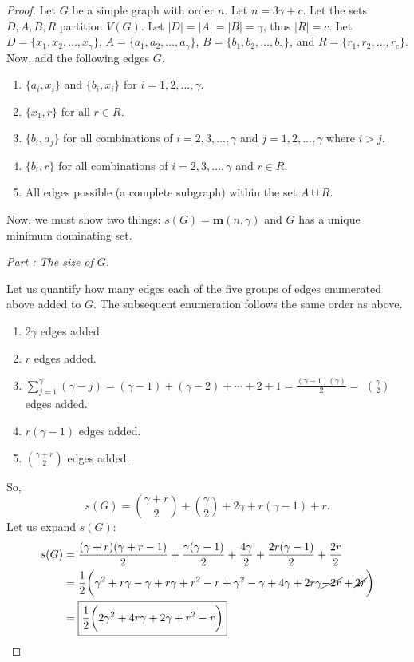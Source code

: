 \documentclass[12pt]{amsart}
\makeatletter
\newcounter{proofpart}
\newcommand{\proofpart}[1]{%
  \par
  \addvspace{\medskipamount}%
  \stepcounter{proofpart}%
  \noindent\emph{Part \theproofpart: #1}\par\nobreak\smallskip
  \@afterheading
}
\makeatother
\begin{document}
\begin{proof}
    Let $G$ be a simple graph with order $n$. Let $n = 3\gamma + c$. Let the sets $D,A,B,R$ partition $V(G)$. Let $|D| = |A| = |B| = \gamma$, thus $|R| = c$. Let $D = \{x_1,x_2,\ldots,x_\gamma\}$, $A = \{a_1,a_2,\ldots,a_\gamma\}$, $B = \{b_1,b_2,\ldots,b_\gamma\}$, and $R = \{r_1,r_2,\ldots,r_c\}$. Now, add the following edges $G$.
\begin{enumerate}
 \item $\{a_i,x_i\}$ and $\{b_i,x_i\}$ for $i = 1,2,\ldots,\gamma$.
 \item $\{x_1,r\}$ for all $r \in R$.
 \item $\{b_i,a_j\}$ for all combinations of $i = 2,3,\ldots,\gamma$ and $j = 1,2,\ldots,\gamma$ where $i > j$.
 \item $\{b_i,r\}$ for all combinations of $i = 2,3,\ldots,\gamma$ and $r\in R$.
\item All edges possible (a complete subgraph) within the set $A \cup R$.
\end{enumerate}
Now, we must show two things: $s(G) = \mathbf{m}(n,\gamma)$ and $G$ has a unique minimum dominating set.
\proofpart{The size of $G$.}
Let us quantify how many edges each of the five groups of edges enumerated above added to $G$. The subsequent enumeration follows the same order as above.
\begin{enumerate}
    \item 2$\gamma$ edges added.
    \item $r$ edges added.
    \item $\sum_{j=1}^\gamma (\gamma - j) = (\gamma - 1) + (\gamma - 2) + \cdots + 2 + 1 = \frac{(\gamma-1)(\gamma)}{2} = $ ${\gamma}\choose{2}$ edges added.
    \item $r(\gamma-1)$ edges added.
    \item ${\gamma + r}\choose{2}$ edges added.
\end{enumerate}
So, $$s(G) = {{\gamma + r}\choose{2}} + {{\gamma}\choose{2}} + 2\gamma + r(\gamma - 1) + r.$$
Let us expand $s(G)$:
\begin{align*}
    s(G) &= \frac{(\gamma + r)(\gamma + r - 1)}{2} + \frac{\gamma(\gamma - 1)}{2} + \frac{4\gamma}{2} + \frac{2r(\gamma - 1)}{2} + \frac{2r}{2}\\
    &= \frac{1}{2}\bigg(\gamma^2 + r\gamma - \gamma + r\gamma + r^2 - r + \gamma^2 - \gamma +  4\gamma + 2r\gamma \cancel{- 2r} + \cancel{2r} \bigg)\\
    &=\boxed{ \frac{1}{2} \bigg(2\gamma^2 + 4r\gamma + 2\gamma + r^2 - r\bigg)}

\end{align*}
\end{proof}
\end{document}
